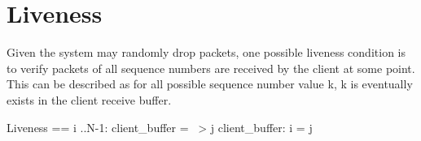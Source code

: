\section{Liveness}

Given the system may randomly drop packets, one possible liveness condition is
to verify packets of all sequence numbers are received by the client at some
point. This can be described as for all possible sequence number value k, k is
eventually exists in the client receive buffer.\\

\begin{tla}
Liveness == 
    \A i ..N-1:
        client_buffer = {} ~> \E j \in client_buffer: i = j 
\end{tla}
\begin{tlatex}
%
%
\end{tlatex}

% 
